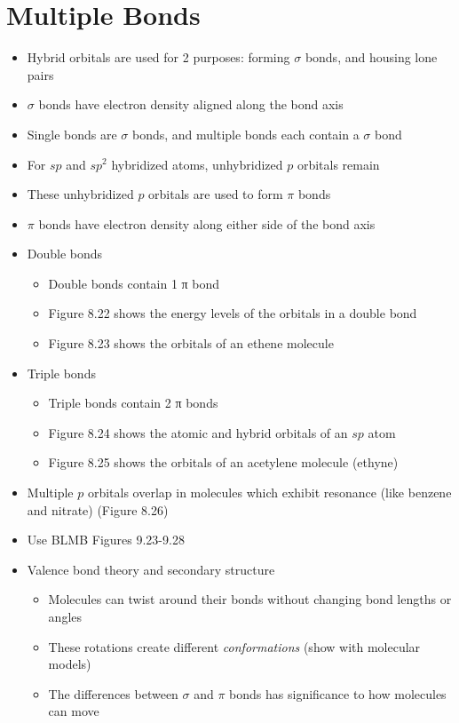 \documentclass[12pt, openany, letterpaper]{memoir}
\begin{document}
\section{Multiple Bonds}
\begin{itemize}
  \item Hybrid orbitals are used for 2 purposes: forming $\sigma$ bonds, and housing lone pairs
  \item $\sigma$ bonds have electron density aligned along the bond axis
  \item Single bonds are $\sigma$ bonds, and multiple bonds each contain a $\sigma$ bond
  \item For $sp$ and $sp^2$ hybridized atoms, unhybridized $p$ orbitals remain
  \item These unhybridized $p$ orbitals are used to form $\pi$ bonds
  \item $\pi$ bonds have electron density along either side of the bond axis
  \item Double bonds
    \begin{itemize}
      \item Double bonds contain 1 π bond
      \item Figure 8.22 shows the energy levels of the orbitals in a double bond
      \item Figure 8.23 shows the orbitals of an ethene molecule
    \end{itemize}
  \item Triple bonds
    \begin{itemize}
      \item Triple bonds contain 2 π bonds
      \item Figure 8.24 shows the atomic and hybrid orbitals of an $sp$ atom
      \item Figure 8.25 shows the orbitals of an acetylene molecule (ethyne)
    \end{itemize}
  \item Multiple $p$ orbitals overlap in molecules which exhibit resonance (like benzene and nitrate) (Figure 8.26)
  \item Use BLMB Figures 9.23-9.28
  \item Valence bond theory and secondary structure
    \begin{itemize}
      \item Molecules can twist around their bonds without changing bond lengths or angles
      \item These rotations create different \emph{conformations} (show with molecular models)
      \item The differences between $\sigma$ and $\pi$ bonds has significance to how molecules can move

\end{itemize}
\end{itemize}
\end{document}
